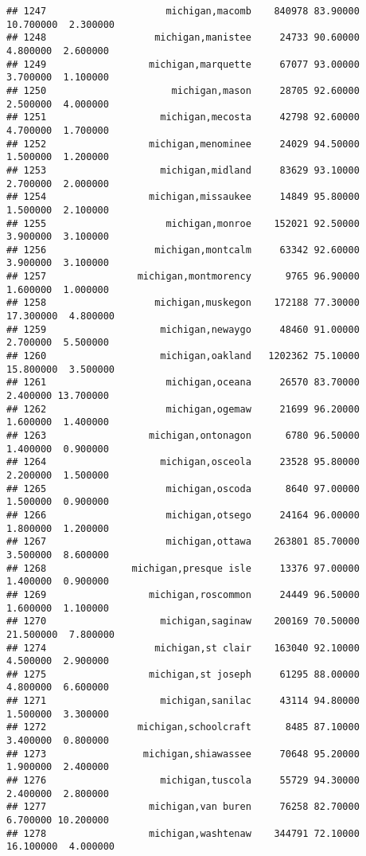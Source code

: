 \documentclass[
]{article}
\begin{document}
\begin{verbatim}
## 1247                     michigan,macomb    840978 83.90000 10.700000  2.300000
## 1248                   michigan,manistee     24733 90.60000  4.800000  2.600000
## 1249                  michigan,marquette     67077 93.00000  3.700000  1.100000
## 1250                      michigan,mason     28705 92.60000  2.500000  4.000000
## 1251                    michigan,mecosta     42798 92.60000  4.700000  1.700000
## 1252                  michigan,menominee     24029 94.50000  1.500000  1.200000
## 1253                    michigan,midland     83629 93.10000  2.700000  2.000000
## 1254                  michigan,missaukee     14849 95.80000  1.500000  2.100000
## 1255                     michigan,monroe    152021 92.50000  3.900000  3.100000
## 1256                   michigan,montcalm     63342 92.60000  3.900000  3.100000
## 1257                michigan,montmorency      9765 96.90000  1.600000  1.000000
## 1258                   michigan,muskegon    172188 77.30000 17.300000  4.800000
## 1259                    michigan,newaygo     48460 91.00000  2.700000  5.500000
## 1260                    michigan,oakland   1202362 75.10000 15.800000  3.500000
## 1261                     michigan,oceana     26570 83.70000  2.400000 13.700000
## 1262                     michigan,ogemaw     21699 96.20000  1.600000  1.400000
## 1263                  michigan,ontonagon      6780 96.50000  1.400000  0.900000
## 1264                    michigan,osceola     23528 95.80000  2.200000  1.500000
## 1265                     michigan,oscoda      8640 97.00000  1.500000  0.900000
## 1266                     michigan,otsego     24164 96.00000  1.800000  1.200000
## 1267                     michigan,ottawa    263801 85.70000  3.500000  8.600000
## 1268               michigan,presque isle     13376 97.00000  1.400000  0.900000
## 1269                  michigan,roscommon     24449 96.50000  1.600000  1.100000
## 1270                    michigan,saginaw    200169 70.50000 21.500000  7.800000
## 1274                   michigan,st clair    163040 92.10000  4.500000  2.900000
## 1275                  michigan,st joseph     61295 88.00000  4.800000  6.600000
## 1271                    michigan,sanilac     43114 94.80000  1.500000  3.300000
## 1272                michigan,schoolcraft      8485 87.10000  3.400000  0.800000
## 1273                 michigan,shiawassee     70648 95.20000  1.900000  2.400000
## 1276                    michigan,tuscola     55729 94.30000  2.400000  2.800000
## 1277                  michigan,van buren     76258 82.70000  6.700000 10.200000
## 1278                  michigan,washtenaw    344791 72.10000 16.100000  4.000000

\end{verbatim}
\end{document}
